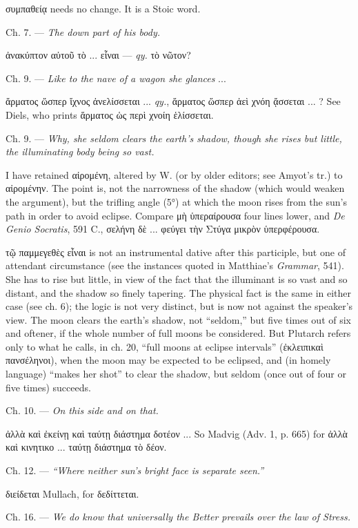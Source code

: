 \documentclass[a4paper, 11pt, oneside, polutonikogreek, english]{article}
\begin{document}
συμπαθείᾳ needs no change. It is a Stoic word.

Ch. 7. --- \emph{The down part of his body.}

ἀνακύπτον αὐτοῦ τὸ ... εἶναι --- \emph{qy.} τὸ νῶτον?

Ch. 9. --- \emph{Like to the nave of a wagon she glances} ...

ἅρματος ὥσπερ ἴχνος ἀνελίσσεται ... \emph{qy.}, ἅρματος ὥσπερ ἀεὶ χνόη ᾄσσεται ... ? See Diels, who prints ἅρματος ὡς περὶ χνοίη ἑλίσσεται.

Ch. 9. --- \emph{Why, she seldom clears the earth's shadow, though she rises but little, the illuminating body being so vast.}

I have retained αἰρομένη, altered by W. (or by older editors; see Amyot's tr.) to αἰρομένην. The point is, not the narrowness of the shadow (which would weaken the argument), but the trifling angle (5°) at which the moon rises from the sun's path in order to avoid eclipse. Compare μὴ ὑπεραίρουσα four lines lower, and \emph{De Genio Socratis}, 591 C., σελήνη δὲ ... φεύγει τὴν Στύγα μικρὸν ὑπερφέρουσα.

τῷ παμμεγεθὲς εἶναι is not an instrumental dative after this participle, but one of attendant circumstance (see the instances quoted in Matthiae's \emph{Grammar}, 541). She has to rise but little, in view of the fact that the illuminant is so vast and so distant, and the shadow so finely tapering. The physical fact is the same in either case (see ch. 6); the logic is not very distinct, but is now not against the speaker's view. The moon clears the earth's shadow, not ``seldom,'' but five times out of six and oftener, if the whole number of full moons be considered. But Plutarch refers only to what he calls, in ch. 20, ``full moons at eclipse intervals'' (ἐκλειπικαὶ πανσέληνοι), when the moon may be expected to be eclipsed, and (in homely language) ``makes her shot'' to clear the shadow, but seldom (once out of four or five times) succeeds.

Ch. 10. --- \emph{On this side and on that.}

ἀλλὰ καὶ ἐκείνῃ καὶ ταύτῃ διάστημα δοτέον ... So Madvig (Adv. 1, p. 665) for ἀλλὰ καὶ κινητικο ... ταύτῃ διάστημα τὸ δέον.

Ch. 12. --- \emph{``Where neither sun's bright face is separate seen.''}

διείδεται Mullach, for δεδίττεται.

Ch. 16. --- \emph{We do know that universally the Better prevails over the law of Stress.}
\end{document}
